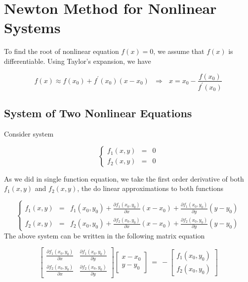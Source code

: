 \documentclass[
]{book}
\begin{document}
\hfill\break

\hypertarget{newton-method-for-nonlinear-systems}{%
\section{Newton Method for Nonlinear Systems}\label{newton-method-for-nonlinear-systems}}

To find the root of nonlinear equation \(f(x) = 0\), we assume that \(f(x)\)
is differentiable. Using Taylor's expansion, we have

\[
f(x) \approx f(x_0) + f^\prime(x_0)(x-x_0) ~~~\Rightarrow ~~~ x = x_0-\frac{f(x_0)}{f^\prime(x_0)}
\]

\hypertarget{system-of-two-nonlinear-equations}{%
\subsection{System of Two Nonlinear Equations}\label{system-of-two-nonlinear-equations}}

Consider system

\[
\left\{
\begin{array}{lcl}
f_1(x,y) & = & 0 \\
f_2(x,y) & = & 0
\end{array}
\right.
\]

As we did in single function equation, we take the first order
derivative of both \(f_1(x,y)\) and \(f_2(x,y)\), the do linear
approximations to both functions

\[
\left\{
\begin{array}{lcl}
f_1(x,y) & = & f_1(x_0, y_0) + \frac{\partial f_1(x_0, y_0)}{\partial x}(x-x_0) + \frac{\partial f_1(x_0,y_0)}{\partial y}(y-y_0) \\
f_2(x,y) & = & f_2(x_0, y_0) + \frac{\partial f_2(x_0, y_0)}{\partial x}(x-x_0) + \frac{\partial f_2(x_0,y_0)}{\partial y}(y-y_0)
\end{array}
\right.
\] The above system can be written in the following matrix equation

\[
\left[
\begin{array}{cc}
\frac{\partial f_1(x_0, y_0)}{\partial x} & \frac{\partial f_1(x_0,y_0)}{\partial y}\\
\frac{\partial f_2(x_0, y_0)}{\partial x} & \frac{\partial f_2(x_0,y_0)}{\partial y}
\end{array}
\right]
\left[
\begin{array}{cc}
x-x_0 \\
y-y_0
\end{array}
\right]
~=~
-
\left[
\begin{array}{cc}
f_1(x_0,y_0)\\
f_2(x_0,y_0)
\end{array}
\right]
\]
\end{document}
